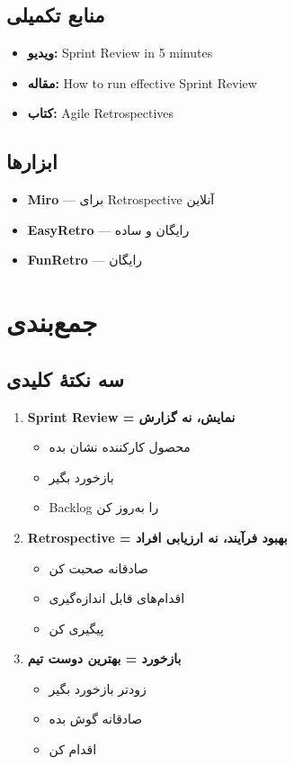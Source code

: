 \documentclass[12pt, a4paper]{article}
\begin{document}
\subsection{منابع تکمیلی}
\begin{itemize}
    \item \textbf{ویدیو:} Sprint Review in 5 minutes
    \item \textbf{مقاله:} How to run effective Sprint Review
    \item \textbf{کتاب:} Agile Retrospectives
\end{itemize}

\subsection{ابزارها}
\begin{itemize}
    \item \textbf{Miro} — برای Retrospective آنلاین
    \item \textbf{EasyRetro} — رایگان و ساده
    \item \textbf{FunRetro} — رایگان
\end{itemize}

\section{جمع‌بندی}

\subsection{سه نکتهٔ کلیدی}

\begin{enumerate}
    \item \textbf{Sprint Review = نمایش، نه گزارش}
    \begin{itemize}
        \item محصول کارکننده نشان بده
        \item بازخورد بگیر
        \item Backlog را به‌روز کن
    \end{itemize}
    \item \textbf{Retrospective = بهبود فرآیند، نه ارزیابی افراد}
    \begin{itemize}
        \item صادقانه صحبت کن
        \item اقدام‌های قابل اندازه‌گیری
        \item پیگیری کن
    \end{itemize}
    \item \textbf{بازخورد = بهترین دوست تیم}
    \begin{itemize}
        \item زودتر بازخورد بگیر
        \item صادقانه گوش بده
        \item اقدام کن
    \end{itemize}
\end{enumerate}
\end{document}
